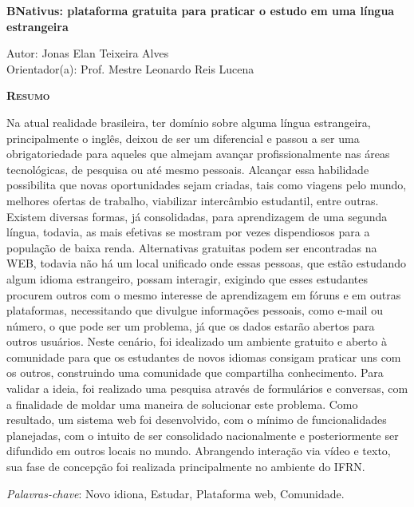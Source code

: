 \begin{center}
	{\Large{\textbf{BNativus: plataforma gratuita para praticar o estudo em uma língua estrangeira}}}
\end{center}

\vspace{1cm}

\begin{flushright}
	Autor: Jonas Elan Teixeira Alves\\
	Orientador(a): Prof. Mestre Leonardo Reis Lucena
\end{flushright}

\vspace{1cm}

\begin{center}
	\Large{\textsc{\textbf{Resumo}}}
\end{center}

\noindent Na atual realidade brasileira, ter domínio sobre alguma língua estrangeira, principalmente o inglês, deixou de ser um diferencial e passou a ser uma obrigatoriedade para aqueles que almejam avançar profissionalmente nas áreas tecnológicas, de pesquisa ou até mesmo pessoais. Alcançar essa habilidade possibilita que novas oportunidades sejam criadas, tais como viagens pelo mundo, melhores ofertas de trabalho, viabilizar intercâmbio estudantil, entre outras. Existem diversas formas, já consolidadas, para aprendizagem de uma segunda língua, todavia, as mais efetivas se mostram por vezes dispendiosos para a população de baixa renda. Alternativas gratuitas podem ser encontradas na WEB, todavia não há um local unificado onde essas pessoas, que estão estudando algum idioma estrangeiro, possam interagir, exigindo que esses estudantes procurem outros com o mesmo interesse de aprendizagem em fóruns e em outras plataformas, necessitando que divulgue informações pessoais, como e-mail ou número, o que pode ser um problema, já que os dados estarão abertos para outros usuários. Neste cenário, foi idealizado um ambiente gratuito e aberto à comunidade para que os estudantes de novos idiomas consigam praticar uns com os outros, construindo uma comunidade que compartilha conhecimento. Para validar a ideia, foi realizado uma pesquisa através de formulários e conversas, com a finalidade de moldar uma maneira de solucionar este problema. Como resultado, um sistema web foi desenvolvido, com o mínimo de funcionalidades planejadas, com o intuito de ser consolidado nacionalmente e posteriormente ser difundido em outros locais no mundo. Abrangendo interação via vídeo e texto, sua fase de concepção foi realizada principalmente no ambiente do IFRN.

\noindent\textit{Palavras-chave}: Novo idiona, Estudar, Plataforma web, Comunidade.